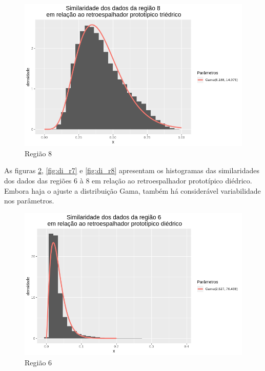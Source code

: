 \documentclass[12pt]{article}
\begin{document}
\begin{figure}[!h]
    \centering    
    \vspace{0.1\linewidth}
    \includegraphics[width = 0.95\linewidth]{../../Images/Report_18_12_17/tri_region8.png}
    \caption{Região 8}
    \label{fig:tri_r8}
\end{figure}

As figuras \ref{fig:di_r6}, \ref{fig:di_r7} e \ref{fig:di_r8} apresentam os histogramas das similaridades dos dados das regiões 6 à 8 em relação ao retroespalhador prototípico diédrico. Embora haja o ajuste a distribuição Gama, também há considerável variabilidade nos parâmetros.

\begin{figure}[!h]
    \centering
    \vspace{0.05\linewidth}
    \includegraphics[width = 0.95\linewidth]{../../Images/Report_18_12_17/di_region6.png}
    \caption{Região 6}
    \label{fig:di_r6}
\end{figure}
\end{document}
